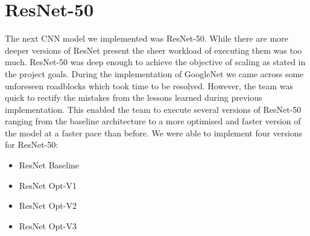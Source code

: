  
 
 
 
 
 
 
 
 




























\section{ResNet-50}
The next CNN model we implemented was ResNet-50. While there are more deeper versions of ResNet present the sheer workload of executing them was too much. ResNet-50 was deep enough to achieve the objective of scaling as stated in the project goals. During the implementation of GoogleNet we came across some unforeseen roadblocks which took time to be resolved. However, the team was quick to rectify the mistakes from the lessons learned during previous implementation. This enabled the team to execute several versions of ResNet-50 ranging from the baseline architecture to a more optimised and faster version of the model at a faster pace than before.
We were able to implement four versions for ResNet-50:
\begin{itemize}
    \item ResNet Baseline
    \item ResNet Opt-V1
    \item ResNet Opt-V2
    \item ResNet Opt-V3
\end{itemize}

